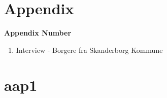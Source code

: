 \chapter{Appendix}

\textbf{Appendix Number}
\begin{enumerate}
	\item Interview - Borgere fra Skanderborg
Kommune
\end{enumerate}



\chapter{aap1}
